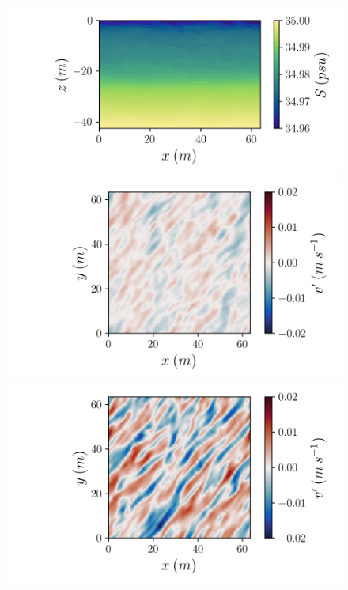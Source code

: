 \documentclass[draft]{styles/agujournal2019}
\begin{document}
\begin{figure}[]
\begin{minipage}{0.45\textwidth}
    \end{minipage}%
    \begin{minipage}{0.55\textwidth}
        \includegraphics[trim={1.5cm 0 0.5cm 0}, clip, width=\textwidth]{Figures/sa_slope1_xz_y64_zmax42_t40.png}
    \end{minipage}
    \begin{minipage}{0.45\textwidth}
        \includegraphics[trim={1.5cm 0 3.4cm 0},clip,width=\textwidth]{Figures/v_slope01_xy_z1_zmax1_t40.png}
    \end{minipage}%
    \begin{minipage}{0.6\textwidth}
        \centering
        \includegraphics[trim={2cm 0 0.5cm 0},clip,width=\textwidth]{Figures/v_slope1_xy_z1_zmax1_t40.png}

\end{minipage}
\end{figure}
\end{document}
